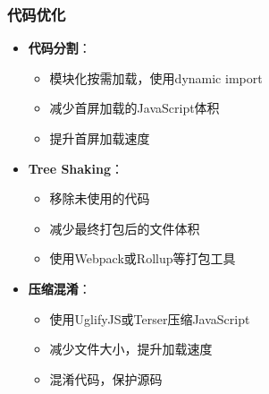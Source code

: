 \documentclass[12pt,a4paper]{article}
\begin{document}
\subsubsection{代码优化}
\begin{itemize}
    \item \textbf{代码分割}：
        \begin{itemize}
            \item 模块化按需加载，使用dynamic import
            \item 减少首屏加载的JavaScript体积
            \item 提升首屏加载速度
        \end{itemize}
    \item \textbf{Tree Shaking}：
        \begin{itemize}
            \item 移除未使用的代码
            \item 减少最终打包后的文件体积
            \item 使用Webpack或Rollup等打包工具
        \end{itemize}
    \item \textbf{压缩混淆}：
        \begin{itemize}
            \item 使用UglifyJS或Terser压缩JavaScript
            \item 减少文件大小，提升加载速度
            \item 混淆代码，保护源码
        \end{itemize}
\end{itemize}
\end{document}
